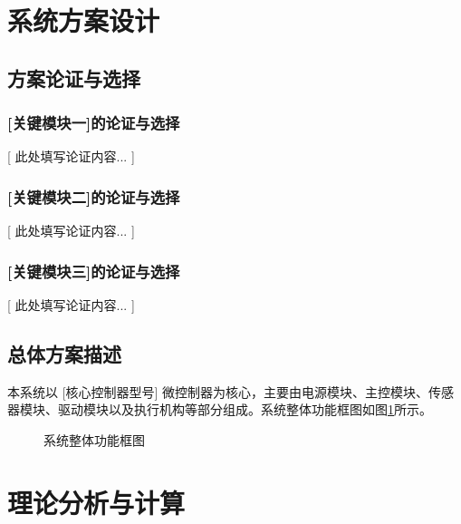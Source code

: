 \documentclass[UTF-8,zihao=-4]{ctexart}
\begin{document}
\section{系统方案设计}

\subsection{方案论证与选择}

\subsubsection{[关键模块一]的论证与选择}
    [ 此处填写论证内容... ]

\subsubsection{[关键模块二]的论证与选择}
    [ 此处填写论证内容... ]

\subsubsection{[关键模块三]的论证与选择}
    [ 此处填写论证内容... ]

\subsection{总体方案描述}
    本系统以 [核心控制器型号] 微控制器为核心，主要由电源模块、主控模块、传感器模块、驱动模块以及执行机构等部分组成。系统整体功能框图如图\ref{fig:system_block}所示。

\begin{figure}[H]
    \centering
    \caption{系统整体功能框图}
    \label{fig:system_block}
\end{figure}

\section{理论分析与计算}
\end{document}
